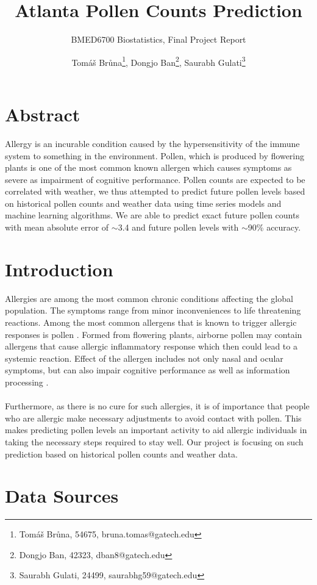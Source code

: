 \documentclass[a4paper,11pt]{article}
\title{Atlanta Pollen Counts Prediction}
\subtitle{BMED6700 Biostatistics, Final Project Report}
\author{Tomáš Brůna\thanks{Tomáš Brůna, 54675, bruna.tomas@gatech.edu},  
Dongjo Ban\thanks{Dongjo Ban, 42323, dban8@gatech.edu}, 
Saurabh Gulati\thanks{Saurabh Gulati, 24499, saurabhg59@gatech.edu}}
\begin{document}
\maketitle

\section*{Abstract}

Allergy is an incurable condition caused by the hypersensitivity of the immune system to something in the environment. Pollen, which is produced by flowering plants is one of the most common known allergen which causes symptoms as severe as impairment of cognitive performance. Pollen counts are expected to be correlated with weather, we thus attempted to predict future pollen levels based on historical pollen counts and weather data using time series models and machine learning algorithms. We are able to predict exact future pollen counts with mean absolute error of $\sim$3.4 and future pollen levels with $\sim$90\% accuracy.


\section{Introduction}
Allergies are among the most common chronic conditions affecting the global population. The symptoms range from minor inconveniences to life threatening reactions. Among the most common allergens that is known to trigger allergic responses is pollen \cite{kiotseridis2013grass}. Formed from flowering plants, airborne pollen may contain allergens that cause allergic inflammatory response which then could lead to a systemic reaction. Effect of the allergen includes not only nasal and ocular symptoms, but can also impair cognitive performance as well as information processing \cite{church2018allergic,bensnes2016you}.\\\\
Furthermore, as there is no cure for such allergies, it is of importance that people who are allergic make necessary adjustments to avoid contact with pollen. This makes predicting pollen levels an important activity to aid allergic individuals in taking the necessary steps required to stay well. Our project is focusing on such prediction based on historical pollen counts and weather data.
\section{Data Sources}
\end{document}
